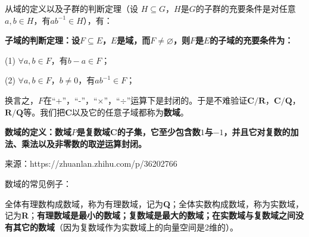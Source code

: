 \documentclass[12pt]{article}
\begin{document}
从域的定义以及子群的判断定理（设 $H \subseteq G$，$H$是$G$的子群的充要条件是对任意$a, b \in H$，有$ab^{-1} \in H$），有：
\begin{mdframed}[
linecolor=black!40,outerlinewidth=1pt,roundcorner=.5em,innertopmargin=1ex,innerbottommargin=.5\baselineskip,innerrightmargin=1em,innerleftmargin=1em,backgroundcolor=gray!5,
]
\textbf{
子域的判断定理：设$F \subseteq E$，$E$是域，而$F \neq \varnothing$，则$F$是$E$的子域的充要条件为：}

(1) $\forall a, b \in F$，有$b - a \in F$；

(2) $\forall a, b \in F$，$b\neq 0$，有$ab^{-1} \in F$；
\end{mdframed}

换言之，$F$在“+”，“-”，“$\times$”，“$\div$”运算下是封闭的。于是不难验证$\textbf{C}/\textbf{R}$，$\textbf{C}/\textbf{Q}$，$\textbf{R}/\textbf{Q}$等。我们把$\textbf{C}$以及它的任意子域都称为\textbf{数域}。

\begin{mdframed}[
linecolor=black!40,outerlinewidth=1pt,roundcorner=.5em,innertopmargin=1ex,innerbottommargin=.5\baselineskip,innerrightmargin=1em,innerleftmargin=1em,backgroundcolor=gray!5,
]
\textbf{
数域的定义：数域$P$是复数域C的子集，它至少包含数$1$与$-1$，并且它对复数的加法、乘法以及非零数的取逆运算封闭。
}

来源：https://zhuanlan.zhihu.com/p/36202766
\end{mdframed}

\begin{framed}
\small{
数域的常见例子：

全体有理数构成数域，称为有理数域，记为\textbf{Q}；全体实数构成数域，称为实数域，记为\textbf{R}；\textbf{有理数域是最小的数域；复数域是最大的数域；在实数域与复数域之间没有其它的数域}（因为复数域作为实数域上的向量空间是2维的）。
}
\end{framed}
\end{document}
